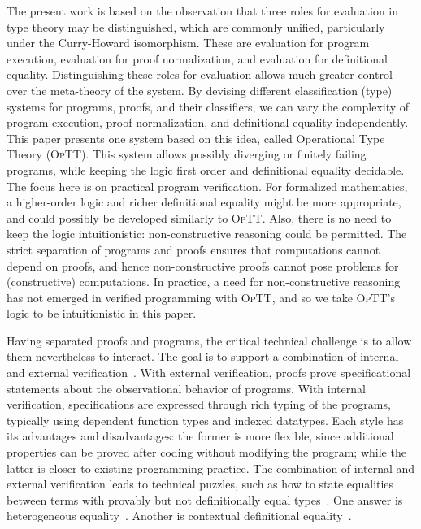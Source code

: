 \documentclass{fundam}
\newcommand{\optt}{\textsc{OpTT}}
\begin{document}
The present work is based on the observation that three roles for
evaluation in type theory may be distinguished, which are commonly
unified, particularly under the Curry-Howard isomorphism.  These are
evaluation for program execution, evaluation for proof normalization,
and evaluation for definitional equality.  Distinguishing these roles
for evaluation allows much greater control over the meta-theory of the
system.  By devising different classification (type) systems for
programs, proofs, and their classifiers, we can vary the complexity of
program execution, proof normalization, and definitional equality
independently.  This paper presents one system based on this idea,
called Operational Type Theory (\optt).  This system allows possibly
diverging or finitely failing programs, while keeping the logic first
order and definitional equality decidable.  The focus here is on
practical program verification.  For formalized mathematics, a
higher-order logic and richer definitional equality might be more
appropriate, and could possibly be developed similarly to \optt.
Also, there is no need to keep the logic intuitionistic:
non-constructive reasoning could be permitted.  The strict separation
of programs and proofs ensures that computations cannot depend on
proofs, and hence non-constructive proofs cannot pose problems for
(constructive) computations.  In practice, a need for non-constructive
reasoning has not emerged in verified programming with \optt, and so
we take \optt's logic to be intuitionistic in this paper.

Having separated proofs and programs, the critical technical challenge
is to allow them nevertheless to interact.  The goal is to support a
combination of internal and external
verification~\cite{alti:esslli96}.  With external verification, proofs
prove specificational statements about the observational behavior of
programs.  With internal verification, specifications are expressed
through rich typing of the programs, typically using dependent
function types and indexed datatypes.  Each style has its advantages
and disadvantages: the former is more flexible, since additional
properties can be proved after coding without modifying the program;
while the latter is closer to existing programming practice.  The
combination of internal and external verification leads to technical
puzzles, such as how to state equalities between terms with provably
but not definitionally equal types~\cite{hofmann+98}.  One answer is
heterogeneous equality~\cite{mcbride99}.  Another is contextual
definitional equality~\cite{blanqui+08}.
\end{document}
